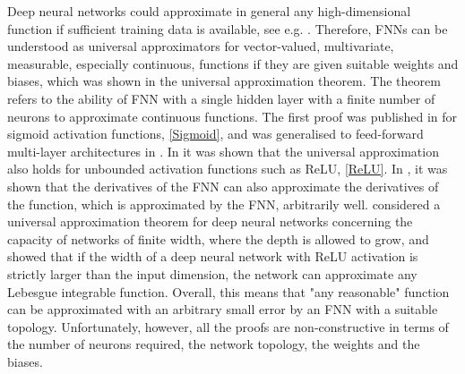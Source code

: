 Deep neural networks could approximate in general any high-dimensional function if sufficient training data is available, see e.g. \cite{ArzaniDawson:2021}. Therefore, FNNs can be understood as universal approximators for vector-valued, multivariate, measurable, especially continuous, functions if they are given suitable weights and biases, which was shown in the universal approximation theorem. The theorem refers to the ability of FNN with a single hidden layer with a finite number of neurons to approximate continuous functions. The first proof was published in \cite{Cybenko:1989} for sigmoid activation functions, \cref{Sigmoid}, and was generalised to feed-forward multi-layer architectures in \cite{Hornik:1991}. In \cite{SonodaMurata:2017} it was shown that the universal approximation also holds for unbounded activation functions such as ReLU, \cref{ReLU}. In \cite{HornikStinchcombeWhite:1990}, it was shown that the derivatives of the FNN can also approximate the derivatives of the function, which is approximated by the FNN, arbitrarily well. \cite{LuPuWangHuWang:2017} considered a universal approximation theorem for deep neural networks concerning the capacity of networks of finite width, where the depth is allowed to grow, and showed that if the width of a deep neural network with ReLU activation is strictly larger than the input dimension, the network can approximate any Lebesgue integrable function. Overall, this means that "any reasonable" function can be approximated with an arbitrary small error by an FNN with a suitable topology. Unfortunately, however, all the proofs are non-constructive in terms of the number of neurons required, the network topology, the weights and the biases. \\

